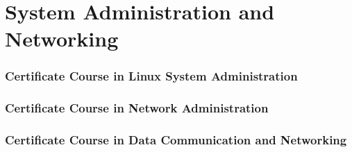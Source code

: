 \section{System Administration and Networking}
\begin{frame}
	\frametitle{{\large Certificate Course in Linux System Administration}}
\end{frame}

\begin{frame}
	\frametitle{Certificate Course in Network Administration}
\end{frame}

\begin{frame}
	\frametitle{{\large Certificate Course in Data Communication and Networking}}
\end{frame}